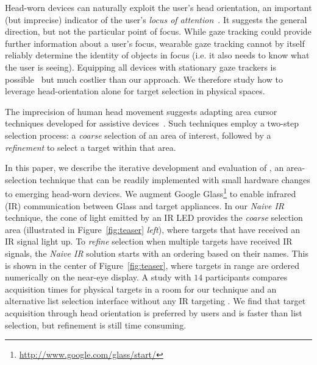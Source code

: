 Head-worn devices can naturally exploit the user's head orientation, an important (but imprecise) indicator of the user's {\em locus of attention}~\cite{raskin}. It suggests the general direction, but not the particular point of focus. While gaze tracking could provide further information about a user's focus, wearable gaze tracking cannot by itself reliably determine the identity of objects in focus (i.e. it also needs to know what the user is seeing). Equipping all devices with stationary gaze trackers is possible~\cite{vertegaal2005media} but much costlier than our approach. We therefore study how to leverage head-orientation alone for target selection in physical spaces. 

The imprecision of human head movement suggests adapting area cursor techniques developed for assistive devices~\cite{kabbash1995prince,worden1997making,findlater2010enhanced}. Such techniques employ a two-step selection process: a {\em coarse} selection of an area of interest, followed by a {\em refinement} to select a target within that area.

In this paper, we describe the iterative development and evaluation of \systemnamenospace, an area-selection technique that can be readily implemented with small hardware changes to emerging head-worn devices. We augment Google Glass\footnote{\url{http://www.google.com/glass/start/}} to enable infrared (IR) communication between Glass and target appliances. In our {\em Naive IR} technique, the cone of light emitted by an IR LED %
 provides the {\em coarse} selection area (illustrated in Figure~\ref{fig:teaser} {\em left}), where targets that have received an IR signal light up. To {\em refine} selection when multiple targets have received IR signals, the {\em Naive IR} solution starts with an ordering based on their names. This is shown in the center of Figure~\ref{fig:teaser}, where targets in range are ordered numerically on the near-eye display. A study with $14$ participants compares acquisition times for physical targets in a room for our technique and an alternative list selection interface without any IR targeting . We find that target acquisition through head orientation is preferred by users and is faster than list selection, but refinement is still time consuming.

